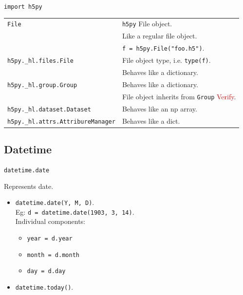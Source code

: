 \texttt{import h5py}

\begin{tabularx}{\linewidth}{lX}
\texttt{File}                       & \texttt{h5py} File object.\\
                                    & Like a regular file object.\\
                                    & \texttt{f = h5py.File("foo.h5")}.\\
\texttt{h5py.\_hl.files.File}       & File object type, i.e. \texttt{type(f)}.\\
                                    & Behaves like a dictionary.\\
\texttt{h5py.\_hl.group.Group}      & Behaves like a dictionary.\\
                                    & File object inherits from \texttt{Group}
                                        \textcolor{red}{Verify}.\\
\texttt{h5py.\_hl.dataset.Dataset}  & Behaves like an np array.\\
\texttt{h5py.\_hl.attrs.AttribureManager} & Behaves like a dict.\\
\end{tabularx}

\texttt{}





\subsection{Datetime}

\begin{center}
   \large{\texttt{datetime.date}} 
\end{center}
Represents date.
\begin{itemize}
\item \texttt{datetime.date(Y, M, D)}.\\
        Eg: \texttt{d = datetime.date(1903, 3, 14)}.\\
        Individual components:
        \begin{itemize}
        \item \texttt{year = d.year}
        \item \texttt{month = d.month}
        \item \texttt{day = d.day}
        \end{itemize}
\item \texttt{datetime.today()}.\\
\end{itemize}


